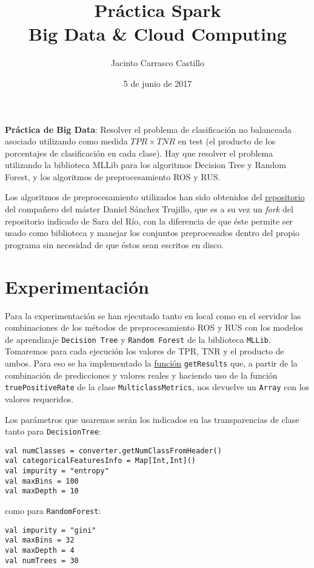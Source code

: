 \documentclass[11pt]{article}
\author{Jacinto Carrasco Castillo}
\date{5 de junio de 2017}
\title{Práctica Spark\\\medskip
\large Big Data \& Cloud Computing}
\begin{document}
\maketitle
\textbf{Práctica de Big Data}: Resolver el problema de clasificación no
 balanceada asociado utilizando como medida \(TPR \times TNR\) en test
 (el producto de los porcentajes de clasificación en cada clase). Hay
 que resolver el problema utilizando la biblioteca MLLib para los
 algoritmos Decision Tree y Random Forest, y los algoritmos de
 preprocesamiento ROS y RUS. 



Los algoritmos de preprocesamiento utilizados han sido obtenidos del
\href{https://github.com/gDanix/Imb-sampling-ROS\_and\_RUS}{repositorio} del compañero del máster Daniel Sánchez Trujillo, que es a
su vez un \emph{fork} del repositorio indicado de Sara del Río, con la
diferencia de que éste permite ser usado como biblioteca y manejar los
conjuntos preprocesados dentro del propio programa sin necesidad de
que éstos sean escritos en disco.

\section{Experimentación}
\label{sec:org74f0206}

Para la experimentación se han ejecutado tanto en local como en el
servidor las combinaciones de los métodos de preprocesamiento ROS y
RUS con los modelos de aprendizaje \texttt{Decision Tree} y \texttt{Random Forest}
de la biblioteca \texttt{MLLib}. Tomaremos para cada ejecución los valores de
TPR, TNR y el producto de ambos. Para eso se ha implementado la
\hyperref[orge32338b]{función} \texttt{getResults} que, a partir de la combinación de predicciones
y valores reales y haciendo uso de la función \texttt{truePositiveRate} de la
clase \texttt{MulticlassMetrics}, nos devuelve un \texttt{Array} con los valores
requeridos.

Los parámetros que usaremos serán los indicados en las transparencias
de clase tanto para \texttt{DecisionTree}:

\begin{verbatim}
val numClasses = converter.getNumClassFromHeader()
val categoricalFeaturesInfo = Map[Int,Int]()
val impurity = "entropy"
val maxBins = 100
val maxDepth = 10
\end{verbatim}
como para \texttt{RandomForest}:

\begin{verbatim}
val impurity = "gini"
val maxBins = 32
val maxDepth = 4
val numTrees = 30
\end{verbatim}
\end{document}
